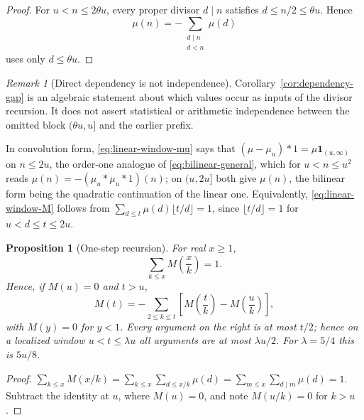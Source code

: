 \documentclass[11pt]{amsart}
\numberwithin{equation}{section}
\theoremstyle{plain}
\newtheorem{proposition}[theorem]{Proposition}
\theoremstyle{definition}
\theoremstyle{remark}
\newtheorem{remark}[theorem]{Remark}
\begin{document}
\begin{proof}
For $u<n\le2\theta u$, every proper divisor $d\mid n$ satisfies
$d\le n/2\le\theta u$.  Hence
\[
\mu(n)=-\sum_{\substack{d\mid n\\ d<n}}\mu(d)
\]
uses only $d\le\theta u$.
\end{proof}

\begin{remark}[Direct dependency is not independence]
Corollary~\ref{cor:dependency-gap} is an algebraic statement about which
values occur as inputs of the divisor recursion.  It does not assert
statistical or arithmetic independence between the omitted block
$(\theta u,u]$ and the earlier prefix.
\end{remark}

In convolution form, \eqref{eq:linear-window-mu} says that
$(\mu-\mu_u)*1=\mu\mathbf 1_{(u,\infty)}$ on $n\le2u$, the order-one analogue
of \eqref{eq:bilinear-general}, which for $u<n\le u^2$ reads
$\mu(n)=-(\mu_u*\mu_u*1)(n)$; on $(u,2u]$ both give $\mu(n)$, the
bilinear form being the quadratic continuation of the linear one. Equivalently, \eqref{eq:linear-window-M}
follows from $\sum_{d\le t}\mu(d)\lfloor t/d\rfloor=1$, since
$\lfloor t/d\rfloor=1$ for $u<d\le t\le2u$.

\begin{proposition}[One-step recursion]
\label{prop:one-step}
For real $x\ge1$,
\begin{equation}
\label{eq:hyperbola-M}
\sum_{k\le x}M\!\left(\frac xk\right)=1 .
\end{equation}
Hence, if $M(u)=0$ and $t>u$,
\begin{equation}
\label{eq:descent-identity}
M(t)=-\sum_{2\le k\le t}\left[M\!\left(\frac tk\right)-M\!\left(\frac uk\right)\right],
\end{equation}
with $M(y)=0$ for $y<1$. Every argument on the right is at most $t/2$; hence on a localized
window $u<t\le\lambda u$ all arguments are at most $\lambda u/2$.  For
$\lambda=5/4$ this is $5u/8$.
\end{proposition}

\begin{proof}
$\sum_{k\le x}M(x/k)=\sum_{k\le x}\sum_{d\le x/k}\mu(d)
=\sum_{m\le x}\sum_{d\mid m}\mu(d)=1$. Subtract the identity at $u$, where
$M(u)=0$, and note $M(u/k)=0$ for $k>u$.
\end{proof}
\end{document}

